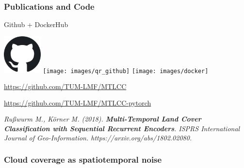 \documentclass[%
  aspectratio=169,
  9pt,
ngerman,
  light,
  mathserif,
  professionalfont,
  affiliationintitlepagehead,
  titlegraphic,
   affiliation,
   navigationbar,
  progressbar,
]{beamer}
\begin{document}
{%

%
%
%

\begin{frame}[c]
\frametitle{Publications and Code}
\centering 

\Large



Github + DockerHub

\vspace{1ex}

\includegraphics[width=2cm]{images/github} \hspace{.5ex}
\texttt{[image: images/qr\_github]} \hspace{.5ex}
\texttt{[image: images/docker]}

\vspace{1ex}

\url{https://github.com/TUM-LMF/MTLCC}

\url{https://github.com/TUM-LMF/MTLCC-pytorch}

\vspace{1em}
\small
\textsl{
	Rußwurm M., Körner M. (2018). \textbf{Multi-Temporal Land Cover Classification with Sequential Recurrent Encoders}. ISPRS International Journal of Geo-Information. https://arxiv.org/abs/1802.02080.
}
	
\end{frame}


\begin{frame}
\frametitle{Cloud coverage as spatiotemporal noise}
\centering

\def\imagewidth{1.5cm}



\end{frame}}
\end{document}
